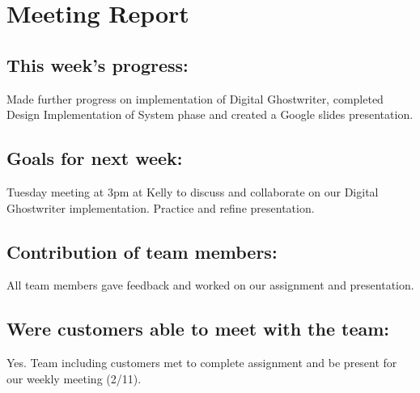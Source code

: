 \documentclass[12pt]{article}
\begin{document}
\section{Meeting Report }

\subsection{This week's progress:}
Made further progress on implementation of Digital Ghostwriter, completed Design Implementation of System phase and created a Google slides presentation.

\subsection{Goals for next week:}
Tuesday meeting at 3pm at Kelly to discuss and collaborate on our Digital Ghostwriter implementation. Practice and refine presentation.

\subsection{Contribution of team members:}
All team members gave feedback and worked on our assignment and presentation.

\subsection{Were customers able to meet with the team:}
Yes. Team including customers met to complete assignment and be present for our weekly meeting (2/11).
\end{document}
